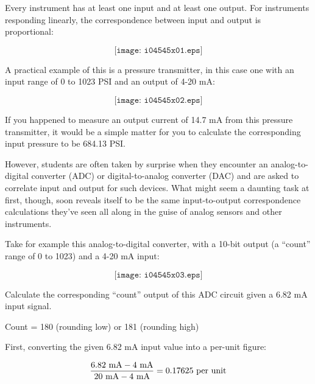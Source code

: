 

Every instrument has at least one input and at least one output.  For instruments responding linearly, the correspondence between input and output is proportional:

$$\texttt{[image: i04545x01.eps]}$$

A practical example of this is a pressure transmitter, in this case one with an input range of 0 to 1023 PSI and an output of 4-20 mA:

$$\texttt{[image: i04545x02.eps]}$$

If you happened to measure an output current of 14.7 mA from this pressure transmitter, it would be a simple matter for you to calculate the corresponding input pressure to be 684.13 PSI.

\vskip 10pt

However, students are often taken by surprise when they encounter an analog-to-digital converter (ADC) or digital-to-analog converter (DAC) and are asked to correlate input and output for such devices.  What might seem a daunting task at first, though, soon reveals itself to be the same input-to-output correspondence calculations they've seen all along in the guise of analog sensors and other instruments.

Take for example this analog-to-digital converter, with a 10-bit output (a ``count'' range of 0 to 1023) and a 4-20 mA input:

$$\texttt{[image: i04545x03.eps]}$$

Calculate the corresponding ``count'' output of this ADC circuit given a 6.82 mA input signal.







Count = 180 (rounding low) or 181 (rounding high)







First, converting the given 6.82 mA input value into a per-unit figure:

$${6.82 \hbox{ mA} - 4 \hbox{ mA} \over 20 \hbox{ mA} - 4 \hbox{ mA}} = 0.17625 \hbox{ per unit}$$

